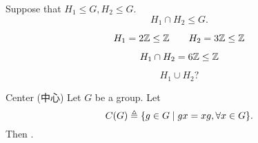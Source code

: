 \begin{frame}
  \begin{theorem}
    Suppose that $H_{1} \le G, H_{2} \le G$.
    \[
      H_{1} \cap H_{2} \le G.
    \]
  \end{theorem}

  \pause
  \[
    H_{1} = 2\mathbb{Z} \le \mathbb{Z} \qquad H_{2} = 3\mathbb{Z} \le \mathbb{Z}
  \]

  \pause
  \[
    H_{1} \cap H_{2} = 6\mathbb{Z} \le \mathbb{Z}
  \]

  \pause
  \[
    H_{1} \cup H_{2} ?
  \]
\end{frame}

\begin{frame}
  \begin{exampleblock}{Center (中心)}
    Let $G$ be a group. Let
    \[
      C(G) \triangleq \{g \in G \mid gx = xg, \forall x \in G\}.
    \]
    Then .
  \end{exampleblock}
\end{frame}
